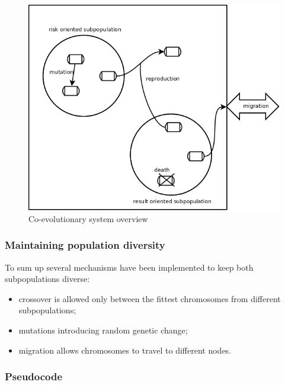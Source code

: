 \begin{figure}[ht]  
	    \begin{center}
	      \includegraphics[scale=.2]{co-evol-2-sub.png}
	    \end{center}
	    \caption{Co-evolutionary system overview} 
	    \label{fig:co-evol}
	  \end{figure}

\subsubsection{Maintaining population diversity}

To sum up several mechanisms have been implemented to keep both subpopulations diverse:

\begin{itemize}
  \item crossover is allowed only between the fittest chromosomes from different subpopulations; 
  \item mutations introducing random genetic change;
  \item migration allows chromosomes to travel to different nodes.  
\end{itemize}

\subsubsection{Pseudocode}



